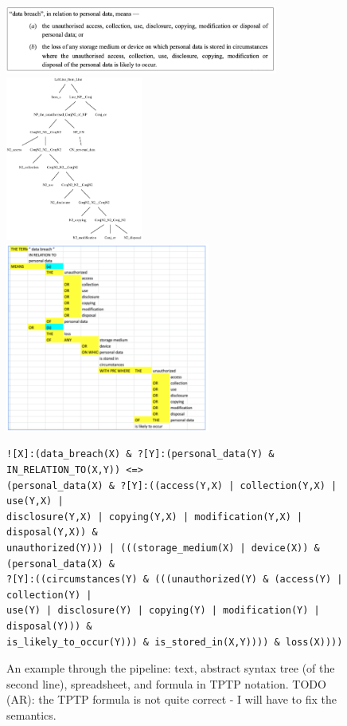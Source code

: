 \documentclass{IOS-Book-Article}
\begin{document}
\begin{figure}
\includegraphics[width=0.8\textwidth]{text.png}
\includegraphics[width=0.4\textwidth]{tree.eps}
\includegraphics[width=0.6\textwidth]{assembly.png}
\small
\begin{verbatim}
![X]:(data_breach(X) & ?[Y]:(personal_data(Y) & IN_RELATION_TO(X,Y)) <=> 
(personal_data(X) & ?[Y]:((access(Y,X) | collection(Y,X) | use(Y,X) | 
disclosure(Y,X) | copying(Y,X) | modification(Y,X) | disposal(Y,X)) & 
unauthorized(Y))) | (((storage_medium(X) | device(X)) & (personal_data(X) & 
?[Y]:((circumstances(Y) & (((unauthorized(Y) & (access(Y) | collection(Y) | 
use(Y) | disclosure(Y) | copying(Y) | modification(Y) | disposal(Y))) & 
is_likely_to_occur(Y))) & is_stored_in(X,Y)))) & loss(X))))
\end{verbatim}
\normalsize
\caption{An example through the pipeline: text, abstract syntax tree (of the second line), spreadsheet, and formula in TPTP notation.
TODO (AR): the TPTP formula is not quite correct - I will have to fix the semantics.
}
\label{pipeline-ex}
\end{figure}
\end{document}
